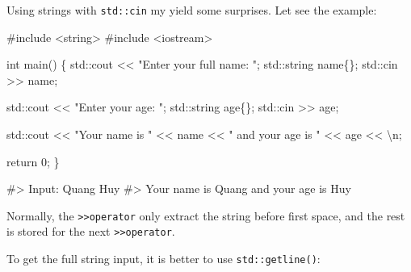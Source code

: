 \documentclass[
  letterpaper,
  DIV=11,
  numbers=noendperiod]{scrreprt}
\newenvironment{Shaded}{\begin{snugshade}}{\end{snugshade}}
\newcommand{\CommentTok}[1]{\textcolor[rgb]{0.37,0.37,0.37}{#1}}
\newcommand{\DecValTok}[1]{\textcolor[rgb]{0.68,0.00,0.00}{#1}}
\newcommand{\ErrorTok}[1]{\textcolor[rgb]{0.68,0.00,0.00}{#1}}
\newcommand{\FunctionTok}[1]{\textcolor[rgb]{0.28,0.35,0.67}{#1}}
\newcommand{\NormalTok}[1]{\textcolor[rgb]{0.00,0.23,0.31}{#1}}
\newcommand{\SpecialCharTok}[1]{\textcolor[rgb]{0.37,0.37,0.37}{#1}}
\newcommand{\StringTok}[1]{\textcolor[rgb]{0.13,0.47,0.30}{#1}}
\begin{document}
Using strings with \texttt{std::cin} my yield some surprises. Let see
the example:

\begin{Shaded}
\begin{Highlighting}[]
\CommentTok{\#include \textless{}string\textgreater{}}
\CommentTok{\#include \textless{}iostream\textgreater{}}

\NormalTok{int }\FunctionTok{main}\NormalTok{()}
\NormalTok{\{}
\NormalTok{    std}\SpecialCharTok{::}\NormalTok{cout }\SpecialCharTok{\textless{}}\ErrorTok{\textless{}} \StringTok{"Enter your full name: "}\NormalTok{;}
\NormalTok{    std}\SpecialCharTok{::}\NormalTok{string name\{\};}
\NormalTok{    std}\SpecialCharTok{::}\NormalTok{cin }\SpecialCharTok{\textgreater{}}\ErrorTok{\textgreater{}}\NormalTok{ name;}

\NormalTok{    std}\SpecialCharTok{::}\NormalTok{cout }\SpecialCharTok{\textless{}}\ErrorTok{\textless{}} \StringTok{"Enter your age: "}\NormalTok{;}
\NormalTok{    std}\SpecialCharTok{::}\NormalTok{string age\{\};}
\NormalTok{    std}\SpecialCharTok{::}\NormalTok{cin }\SpecialCharTok{\textgreater{}}\ErrorTok{\textgreater{}}\NormalTok{ age;}

\NormalTok{    std}\SpecialCharTok{::}\NormalTok{cout }\SpecialCharTok{\textless{}}\ErrorTok{\textless{}} \StringTok{"Your name is "} \SpecialCharTok{\textless{}}\ErrorTok{\textless{}}\NormalTok{ name }\SpecialCharTok{\textless{}}\ErrorTok{\textless{}} \StringTok{" and your age is "} \SpecialCharTok{\textless{}}\ErrorTok{\textless{}}\NormalTok{ age }\SpecialCharTok{\textless{}}\ErrorTok{\textless{}} \StringTok{\textquotesingle{}}\SpecialCharTok{\textbackslash{}n}\StringTok{\textquotesingle{}}\NormalTok{;}

\NormalTok{    return }\DecValTok{0}\NormalTok{;}
\NormalTok{\}}

\CommentTok{\#\textgreater{} Input: Quang Huy}
\CommentTok{\#\textgreater{} Your name is Quang and your age is Huy}
\end{Highlighting}
\end{Shaded}

Normally, the \texttt{\textgreater{}\textgreater{}operator} only extract
the string before first space, and the rest is stored for the next
\texttt{\textgreater{}\textgreater{}operator}.

To get the full string input, it is better to use
\texttt{std::getline()}:
\end{document}
